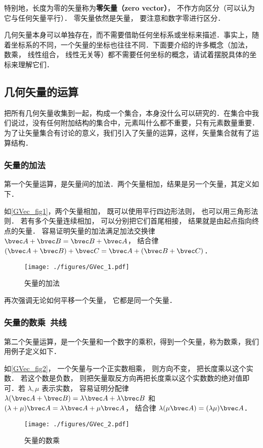 特别地，长度为零的矢量称为\textbf{零矢量（zero vector）}， 不作方向区分（可以认为它与任何矢量平行）． 零矢量依然是矢量， 要注意和数字零进行区分．

几何矢量本身可以单独存在，而不需要借助任何坐标系或坐标来描述．事实上，随着坐标系的不同，一个矢量的坐标也往往不同．下面要介绍的许多概念（加法， 数乘， 线性组合， 线性无关等）都不需要任何坐标的概念，请试着摆脱具体的坐标来理解它们．

\subsection{几何矢量的运算}

把所有几何矢量收集到一起，构成一个集合，本身没什么可以研究的．在集合中我们说过，没有任何附加结构的集合中，元素叫什么都不重要，只有元素数量重要．为了让矢量集合有讨论的意义，我们引入了矢量的运算，这样，矢量集合就有了运算结构．

\subsubsection{矢量的加法}
第一个矢量运算，是矢量间的加法．两个矢量相加，结果是另一个矢量，其定义如下．

如\autoref{GVec_fig1}，两个矢量相加， 既可以使用平行四边形法则， 也可以用三角形法则． 若有多个矢量连续相加， 可以分别把它们首尾相接， 结果就是由起点指向终点的矢量． 容易证明矢量的加法满足加法交换律 $\bvec A + \bvec B = \bvec B + \bvec A$， 结合律 $(\bvec A + \bvec B) + \bvec C = \bvec A + (\bvec B + \bvec C)$．
\begin{figure}[ht]
\centering
\texttt{[image: ./figures/GVec\_1.pdf]}
\caption{矢量的加法} \label{GVec_fig1}
\end{figure}
再次强调无论如何平移一个矢量， 它都是同一个矢量．

\subsubsection{矢量的数乘\ 共线}
第二个矢量运算，是一个矢量和一个数字的乘积，得到一个矢量，称为数乘，我们用例子定义如下．

如\autoref{GVec_fig2}， 一个矢量与一个正实数相乘， 则方向不变， 把长度乘以这个实数． 若这个数是负数， 则把矢量取反方向再把长度乘以这个实数数的绝对值即可．若 $\lambda, \mu$ 表示实数， 容易证明分配律 $\lambda(\bvec A + \bvec B) = \lambda\bvec A + \lambda\bvec B$ 和 $(\lambda+\mu)\bvec A = \lambda\bvec A + \mu\bvec A$， 结合律 $\lambda(\mu\bvec A) = (\lambda\mu) \bvec A$．
\begin{figure}[ht]
\centering
\texttt{[image: ./figures/GVec\_2.pdf]}
\caption{矢量的数乘} \label{GVec_fig2}
\end{figure}

